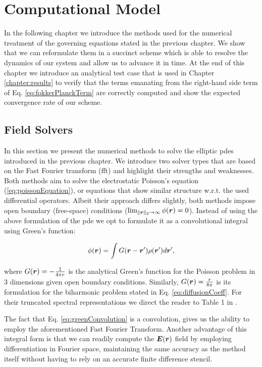 \chapter{Computational Model}
\label{chapter:computational_model}

In the following chapter we introduce the methods used for the numerical treatment of the governing equations
stated in the previous chapter.
We show that we can reformulate them in a succinct scheme which is able to resolve the dynamics of our system and allow
us to advance it in time.
At the end of this chapter we introduce an analytical test case that is used in Chapter \ref{chapter:results} to verify that the terms
emanating from the right-hand side term of Eq. \ref{eq:fokkerPlanckTerm} are correctly computed 
and show the expected convergence rate of our scheme.

\section{Field Solvers}
\label{section:field_solvers}

In this section we present the numerical methods to solve the elliptic \gls{pde}s introduced in the
previous chapter.
We introduce two solver types that are based on the Fast Fourier transform (\gls{fft})
and highlight their strengths and weaknesses.
Both methods aim to solve the electrostatic Poisson's equation (\ref{eq:poissonEquation}), or
equations that show similar structure w.r.t. the used differential operators.
Albeit their approach differs slightly, both methods impose open boundary (free-space)
conditions ($\lim_{\lVert \boldsymbol{r} \rVert_2 \to \infty} \phi(\boldsymbol{r}) = 0$).
Instead of using the above formulation of the \gls{pde} we opt to formulate it as a convolutional integral
using Green's function:

\begin{equation}
    \phi(\boldsymbol{r}) = \int G(\boldsymbol{r} - \boldsymbol{r}') \rho(\boldsymbol{r}') d \boldsymbol{r}',
    \label{eq:greenConvolution}
\end{equation}

where $G(\boldsymbol{r}) = -\frac{1}{4\pi r}$ is the analytical Green's function for the Poisson problem in 3
dimensions given open boundary conditions. 
Similarly, $G(\boldsymbol{r}) = \frac{r}{8 \pi}$ is its formulation for the biharmonic problem stated in Eq.
\ref{eq:diffusionCoeff}.
For their truncated spectral representations we direct the reader to Table 1 in \cite{vicoGreengard2016}.

The fact that Eq. \ref{eq:greenConvolution} is a convolution, gives us the ability to employ the
aforementioned Fast Fourier Transform.
Another advantage of this integral form is that we can readily compute the $\boldsymbol{E}(\boldsymbol{r})$ field
by employing differentiation in Fourier space, maintaining the same accuracy as the method itself
without having to rely on an accurate finite difference stencil.

